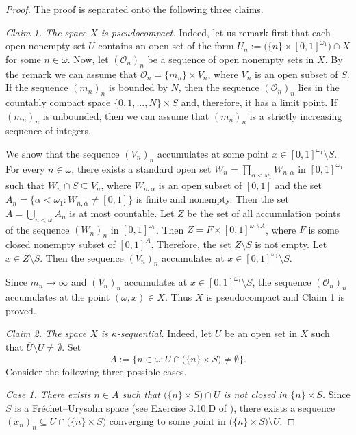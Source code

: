 \documentclass[preprint,11pt]{elsarticle}
\numberwithin{equation}{section}
\numberwithin{theorem}{section}
\newcommand{\w}{\omega}
\begin{document}
\begin{proof}
The proof is separated onto the following three claims.
\smallskip

{\em Claim 1. The space $X$ is pseudocompact.} Indeed, let us remark first that each open nonempty set $U$ contains an open set of the form $U_n:=\big(\{n\}\times [0,1]^{\w_1}\big)\cap X$ for some $n\in\w$. Now, let $(\mathcal{O}_n)_n$ be a sequence of open nonempty sets in $X$. By the remark we can assume that $\mathcal{O}_n=\{m_n\}\times V_n$, where $V_n$ is an open subset of $S$. If the sequence $(m_n)_n$ is bounded by $N$, then the sequence $(\mathcal{O}_n)_n$ lies in the countably compact space $\{0,1,...,N\}\times S$ and, therefore, it has a limit point. If $(m_n)_n$ is unbounded, then we can assume that $(m_n)_n$ is a strictly increasing sequence of integers.


We show that the sequence $(V_n)_n$ accumulates at some point $x\in [0,1]^{\w_1}\setminus S$. For every $n\in\w$, there exists a standard open set $W_n=\prod_{\alpha<\w_1} W_{n,\alpha}$ in $[0,1]^{\w_1}$  such that $W_n\cap S\subseteq V_n$, where $W_{n,\alpha}$ is an open subset of $[0,1]$ and the set $A_n=\{\alpha<\w_1: W_{n,\alpha}\neq[0,1]\}$ is finite and nonempty. Then the set $A=\bigcup_{n<\w} A_n$ is at most countable. Let $Z$ be the set of all accumulation points of the sequence $(W_n)_n$ in $[0,1]^{\w_1}$. Then $Z=F\times [0,1]^{\w_1\setminus A}$, where $F$ is some closed nonempty subset of $[0,1]^A$.
Therefore, the set $Z\setminus S$ is not empty. Let $x\in Z\setminus S$.
Then the sequence $(V_n)_n$ accumulates at $x\in [0,1]^{\w_1}\setminus S$.

Since $m_n\to\infty$ and $(V_n)_n$ accumulates at $x\in [0,1]^{\w_1}\setminus S$, the sequence $(\mathcal{O}_n)_n$ accumulates at the point $(\w,x)\in X$. Thus $X$  is pseudocompact and Claim 1 is proved.
\smallskip

{\em Claim 2. The space $X$ is $\kappa$-sequential.} Indeed, let $U$ be an open set in $X$ such that $\overline{U}\setminus U\neq\emptyset$.
Set
\[
A:=\big\{n\in\w: U\cap \big(\{n\}\times  S\big)\neq\emptyset\big\}.
\]
Consider the following three possible cases.

{\em Case 1. There exists $n\in A$ such that $\big(\{n\}\times  S\big)\cap U$ is not closed in $\{n\}\times  S$.} Since $S$ is a Fr\'{e}chet--Urysohn space (see Exercise 3.10.D of \cite{Eng}), there exists a sequence $(x_n)_n\subseteq U\cap \big(\{n\}\times  S\big)$ converging to some point in $\big(\{n\}\times  S\big)\setminus U$.


\end{proof}
\end{document}
